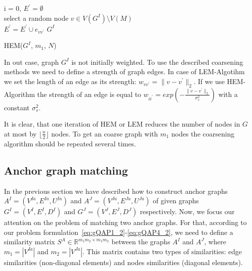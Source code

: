 \begin{algorithm}[h]
	i = 0, $E^\prime=\emptyset$ \\
	{ select a random node $v\in V(G^I)\setminus V(M)$ \\
	  {$E^\prime=E^\prime\cup{e_{vv^\prime}}$}
	}
	\Return $G^I$
	\caption{HEM($G^I$, $m_1$, $N$)} \label{alg:HEM}
\end{algorithm}

In out case, graph $G^I$ is not initially weighted. To use the described coarsening methods we need to define a strength of graph edges. In case of LEM-Algotihm we set the length of an edge as its strength: $w_{vv^\prime}=\|v-v^\prime\|_{2}$. If we use HEM-Algorithm the strength of an edge is equal to $w_{ii^\prime} = exp(-\frac{\|v-v^\prime\|_{2}}{\sigma^2_{s}})$ with a constant $\sigma^2_{s}$.

It is clear, that one iteration of HEM or LEM reduces the number of nodes in $G$ at most by $\lfloor\frac{n}{2} \rfloor$ nodes. To get an coarse graph with $m_1$ nodes the coarsening algorithm should be repeated several times.

\subsection{Anchor graph matching}
In the previous section we have described how to construct anchor graphs $A^I=(V^{Ia},E^{Ia}, U^{Ia})$ and $A^J=(V^{Ja},E^{Ja},U^{Ja})$ of given graphs $G^I = (V^I, E^I, D^I)$ and $G^J=(V^J, E^J, D^J)$ respectively. Now, we focus our attention on the problem of matching two anchor graphs. For that, according to our problem formulation~\eqref{eq:gQAP1_2}-\eqref{eq:gQAP4_2}, we need to define a similarity matrix $S^A\in\mathbb{R}^{m_1m_2\times m_1m_2}$ between the graphs $A^I$ and $A^J$, where $m_1=|V^{Ia}|$ and $m_2=|V^{Ja}|$. This matrix contains two types of similarities: edge similarities (non-diagonal elements) and nodes similarities (diagonal elements).


